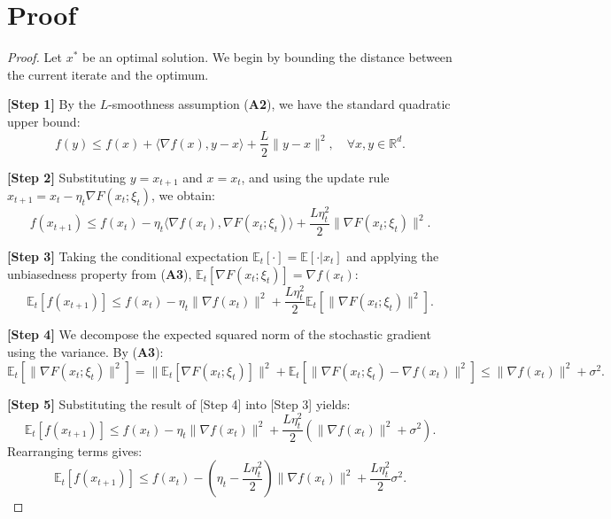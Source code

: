 \documentclass[11pt]{article}
\begin{document}
\section{Proof}

\begin{proof}
Let $x^*$ be an optimal solution. We begin by bounding the distance between the current iterate and the optimum.

\textbf{[Step 1]} By the $L$-smoothness assumption (\textbf{A2}), we have the standard quadratic upper bound:
$$ f(y) \le f(x) + \langle \nabla f(x), y - x \rangle + \frac{L}{2} \|y - x\|^2, \quad \forall x, y \in \mathbb{R}^d. $$

\textbf{[Step 2]} Substituting $y = x_{t+1}$ and $x = x_t$, and using the update rule $x_{t+1} = x_t - \eta_t \nabla F(x_t; \xi_t)$, we obtain:
$$ f(x_{t+1}) \le f(x_t) - \eta_t \langle \nabla f(x_t), \nabla F(x_t; \xi_t) \rangle + \frac{L \eta_t^2}{2} \|\nabla F(x_t; \xi_t)\|^2. $$

\textbf{[Step 3]} Taking the conditional expectation $\mathbb{E}_t[\cdot] = \mathbb{E}[\cdot | x_t]$ and applying the unbiasedness property from (\textbf{A3}), $\mathbb{E}_t[\nabla F(x_t; \xi_t)] = \nabla f(x_t)$:
$$ \mathbb{E}_t[f(x_{t+1})] \le f(x_t) - \eta_t \|\nabla f(x_t)\|^2 + \frac{L \eta_t^2}{2} \mathbb{E}_t[\|\nabla F(x_t; \xi_t)\|^2]. $$

\textbf{[Step 4]} We decompose the expected squared norm of the stochastic gradient using the variance. By (\textbf{A3}):
$$ \mathbb{E}_t[\|\nabla F(x_t; \xi_t)\|^2] = \|\mathbb{E}_t[\nabla F(x_t; \xi_t)]\|^2 + \mathbb{E}_t[\|\nabla F(x_t; \xi_t) - \nabla f(x_t)\|^2] \le \|\nabla f(x_t)\|^2 + \sigma^2. $$

\textbf{[Step 5]} Substituting the result of [Step 4] into [Step 3] yields:
$$ \mathbb{E}_t[f(x_{t+1})] \le f(x_t) - \eta_t \|\nabla f(x_t)\|^2 + \frac{L \eta_t^2}{2} (\|\nabla f(x_t)\|^2 + \sigma^2). $$
Rearranging terms gives:
$$ \mathbb{E}_t[f(x_{t+1})] \le f(x_t) - \left( \eta_t - \frac{L \eta_t^2}{2} \right) \|\nabla f(x_t)\|^2 + \frac{L \eta_t^2}{2} \sigma^2. $$


\end{proof}
\end{document}
